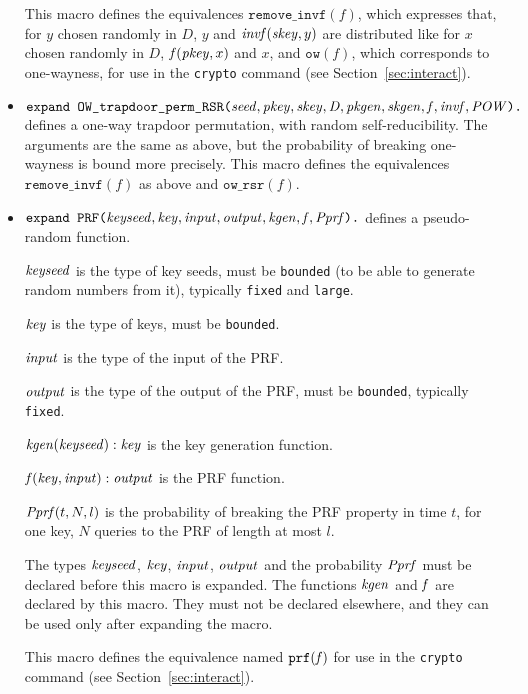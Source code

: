 \documentclass{article}
\begin{document}
\begin{itemize}
   This macro defines the equivalences $\texttt{remove\_invf}(f)$,
   which expresses that, for $y$ chosen randomly in $D$, $y$ and
   $\mathit{invf}(\mathit{skey}, y)$ are distributed like for $x$ chosen
   randomly in $D$, $\mathit{f}(\mathit{pkey}, x)$ and $x$, and
   $\texttt{ow}(f)$, which corresponds to one-wayness, for use in the
   \texttt{crypto} command (see Section~\ref{sec:interact}).

\item $\texttt{expand OW\_trapdoor\_perm\_RSR(}\mathit{seed}, \mathit{pkey}, \mathit{skey}, \mathit{D}, \mathit{pkgen}, \mathit{skgen}, \mathit{f}, \mathit{invf}, \mathit{POW}\texttt{).}$ defines a one-way trapdoor permutation, with random self-reducibility. The arguments are the same as above, but the probability of breaking one-wayness is bound more precisely. This macro defines the equivalences $\texttt{remove\_invf}(f)$ as above and $\texttt{ow\_rsr}(f)$.

\item $\texttt{expand PRF(}\mathit{keyseed}, \mathit{key}, \mathit{input}, \mathit{output}, \mathit{kgen}, \mathit{f}, \mathit{Pprf}\texttt{).}$ 
defines a pseudo-random function.

   $\mathit{keyseed}$ is the type of key seeds, must be \texttt{bounded} (to be able to generate random numbers from it), typically \texttt{fixed} and \texttt{large}.

   $\mathit{key}$ is the type of keys, must be \texttt{bounded}.

   $\mathit{input}$ is the type of the input of the PRF.

   $\mathit{output}$ is the type of the output of the PRF, must be \texttt{bounded}, typically \texttt{fixed}.

   $\mathit{kgen}(\mathit{keyseed}): \mathit{key}$ is the key generation function.

   $\mathit{f}(\mathit{key}, \mathit{input}):\mathit{output}$ is the PRF function.

   $\mathit{Pprf}(t, N, l)$ is the probability of breaking the PRF property
   in time $t$, for one key, $N$ queries to the PRF of length at most $l$.

   The types $\mathit{keyseed}$, $\mathit{key}$, $\mathit{input}$, $\mathit{output}$
   and the probability $\mathit{Pprf}$ must be declared before this macro
   is expanded. The functions $\mathit{kgen}$ and $\mathit{f}$ are declared by
   this macro. They must not be declared elsewhere, and they can be
   used only after expanding the macro.

   This macro defines the equivalence named $\texttt{prf}(\mathit{f})$
   for use in the \texttt{crypto} command 
   (see Section~\ref{sec:interact}).


\end{itemize}
\end{document}
